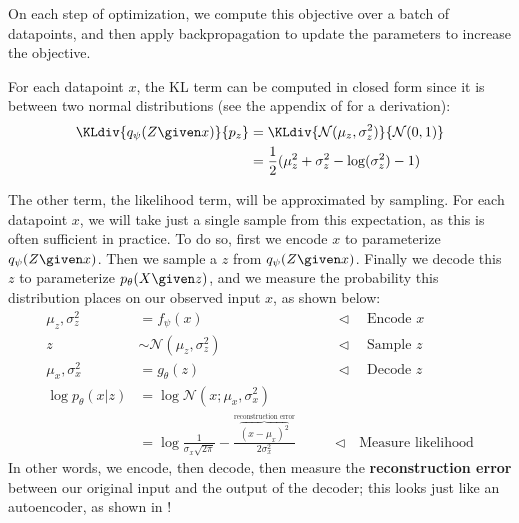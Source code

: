 On each step of optimization, we compute this objective over a batch of datapoints, and then apply backpropagation to update the parameters to increase the objective. 

For each datapoint $x$, the KL term can be computed in closed form since it is between two normal distributions (see the appendix of \cite{kingma2013auto} for a derivation):
\begin{align}
    \KLdiv{q_{\psi}(Z \given x)}{p_{z}} &= \KLdiv{\mathcal{N}(\mu_z,\sigma^2_z)}{\mathcal{N}(0,1)}\\
    &= \frac{1}{2}(\mu_z^2 + \sigma_z^2 - \log(\sigma_z^2) - 1)
\end{align}

The other term, the likelihood term, will be approximated by sampling. For each datapoint $x$, we will take just a single sample from this expectation, as this is often sufficient in practice. To do so, first we encode $x$ to parameterize $q_{\psi}(Z \given x)$. Then we sample a $z$ from $q_{\psi}(Z \given x)$. Finally we decode this $z$ to parameterize $p_{\theta}(X \given z)$, and we measure the probability this distribution places on our observed input $x$, as shown below:
\begin{align}
    \mu_z, \sigma^2_z &= f_{\psi}(x) & \quad\quad \triangleleft \quad\text{Encode $x$}\\
    z &\sim \mathcal{N}(\mu_z, \sigma^2_z) & \quad\quad \triangleleft \quad\text{Sample $z$} \label{eqn:generative_modeling_meets_representation_learning:sampling_z_step}\\
    \mu_x, \sigma^2_x &= g_{\theta}(z) & \quad\quad \triangleleft \quad\text{Decode $z$}\\
    \log p_{\theta}(x | z) &= \log \mathcal{N}(x; \mu_x, \sigma^2_x) &\\
                          &= \log\frac{1}{\sigma_x\sqrt{2\pi}} - \frac{\overbrace{(x - \mu_x)^2}^{\text{reconstruction error}}}{2\sigma_x^2} & \quad\quad \triangleleft \quad\text{Measure likelihood}
\end{align}
In other words, we encode, then decode, then measure the \textbf{reconstruction error} between our original input and the output of the decoder; this looks just like an autoencoder, as shown in \fig{\ref{fig:generative_modeling_and_representation_learning:VAE_as_autoencoder}}!
